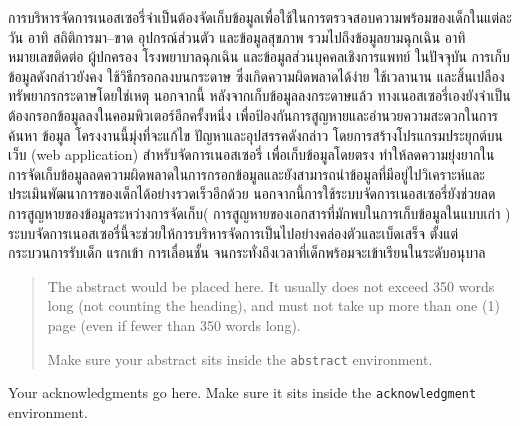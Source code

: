 \maketitle
\makesignature

\ifproject
\begin{abstractTH}
    การบริหารจัดการเนอสเซอรี่จําเป็นต้องจัดเก็บข้อมูลเพื่อใช้ในการตรวจสอบความพร้อมของเด็กในแต่ละ
    วัน อาทิ สถิติการมา–ขาด อุปกรณ์ส่วนตัว และข้อมูลสุขภาพ รวมไปถึงข้อมูลยามฉุกเฉิน อาทิ หมายเลขติดต่อ ผู้ปกครอง โรงพยาบาลฉุกเฉิน และข้อมูลส่วนบุคคลเชิงการแพทย์ ในปัจจุบัน การเก็บข้อมูลดังกล่าวยังคง ใช้วิธีกรอกลงบนกระดาษ ซึ่งเกิดความผิดพลาดได้ง่าย ใช้เวลานาน และสิ้นเปลืองทรัพยากรกระดาษโดยใช่เหตุ นอกจากนี้ หลังจากเก็บข้อมูลลงกระดาษแล้ว ทางเนอสเซอรี่เองยังจําเป็นต้องกรอกข้อมูลลงในคอมพิวเตอร์อีกครั้งหนึ่ง เพื่อป้องกันการสูญหายและอํานวยความสะดวกในการค้นหา
\enskip
ข้อมูล โครงงานนี้มุ่งที่จะแก้ไข ปัญหาและอุปสรรคดังกล่าว โดยการสร้างโปรแกรมประยุกต์บนเว็บ (web application) สําหรับจัดการเนอสเซอรี่ เพื่อเก็บข้อมูลโดยตรง ทําให้ลดความยุ่งยากในการจัดเก็บข้อมูลลดความผิดพลาดในการกรอกข้อมูลและยังสามารถนําข้อมูลที่มีอยู่ไปวิเคราะห์และประเมินพัฒนาการของเด็กได้อย่างรวดเร็วอีกด้วย นอกจากนี้การใช้ระบบจัดการเนอสเซอรี่ยังช่วยลดการสูญหายของข้อมูลระหว่างการจัดเก็บ( การสูญหายของเอกสารที่มักพบในการเก็บข้อมูลในแบบเก่า )  ระบบจัดการเนอสเซอรี่นี้จะช่วยให้การบริหารจัดการเป็นไปอย่างคล่องตัวและเบ็ดเสร็จ ตั้งแต่กระบวนการรับเด็ก แรกเข้า การเลื่อนชั้น จนกระทั่งถึงเวลาที่เด็กพร้อมจะเข้าเรียนในระดับอนุบาล


\end{abstractTH}

\begin{abstract}
The abstract would be placed here. It usually does not exceed 350 words
long (not counting the heading), and must not take up more than one (1) page
(even if fewer than 350 words long).

Make sure your abstract sits inside the \texttt{abstract} environment.
\end{abstract}

\iffalse
\begin{dedication}
This document is dedicated to all Chiang Mai University students.

Dedication page is optional.
\end{dedication}
\fi %

\begin{acknowledgments}
Your acknowledgments go here. Make sure it sits inside the
\texttt{acknowledgment} environment.

\end{acknowledgments}%
\fi %

\contentspage

\ifproject
\figurelistpage

\tablelistpage
\fi %



